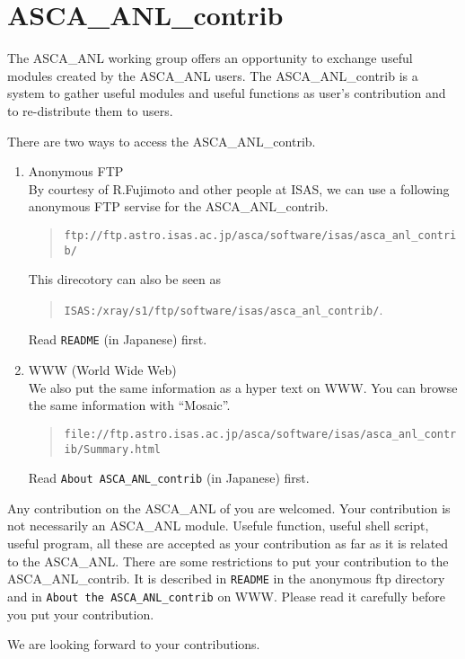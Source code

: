\section*{ASCA\_ANL\_contrib}
The ASCA\_ANL working group offers an opportunity
to exchange useful modules created by the ASCA\_ANL users.
The ASCA\_ANL\_contrib is a system
to gather useful modules and useful functions as user's contribution
and to re-distribute them to users.

There are two ways to access the ASCA\_ANL\_contrib.
\begin{enumerate}
\item Anonymous FTP \\
  By courtesy of R.Fujimoto and other people at ISAS,
  we can use a following anonymous FTP servise for the ASCA\_ANL\_contrib.
  \begin{quote}
     {\tt ftp://ftp.astro.isas.ac.jp/asca/software/isas/asca\_anl\_contrib/}
  \end{quote}
  This direcotory can also be seen as
  \begin{quote}
     {\tt ISAS:/xray/s1/ftp/software/isas/asca\_anl\_contrib/}.
  \end{quote}
  Read {\tt README} (in Japanese) first.
\item WWW (World Wide Web) \\
  We also put the same information as a hyper text on WWW.
  You can browse the same information with ``Mosaic''.
  \begin{quote}
     {\tt file://ftp.astro.isas.ac.jp/asca/software/isas/asca\_anl\_contrib/Summary.html}
  \end{quote}
  Read {\tt About ASCA\_ANL\_contrib} (in Japanese) first.
\end{enumerate}

Any contribution on the ASCA\_ANL of you are welcomed.
Your contribution is not necessarily an ASCA\_ANL module.
Usefule function, useful shell script, useful program,
all these are accepted as your contribution
as far as it is related to the ASCA\_ANL.
There are some restrictions to put your contribution to the ASCA\_ANL\_contrib.
It is described in {\tt README} in the anonymous ftp directory
and in {\tt About the ASCA\_ANL\_contrib} on WWW.
Please read it carefully before you put your contribution.

We are looking forward to your contributions.
